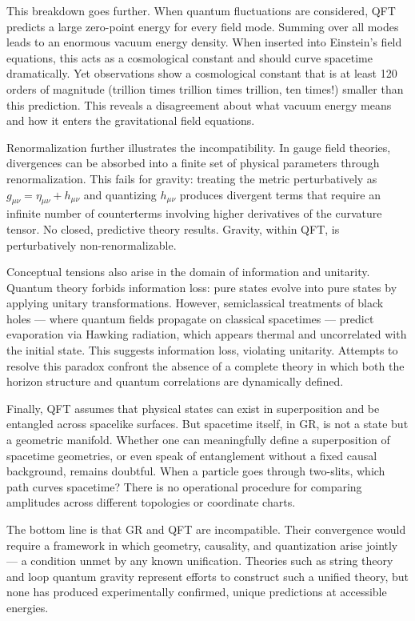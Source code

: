 This breakdown goes further. When quantum fluctuations are considered, QFT predicts a large zero-point energy for every field mode. Summing over all modes leads to an enormous vacuum energy density. When inserted into Einstein’s field equations, this acts as a cosmological constant and should curve spacetime dramatically. Yet observations show a cosmological constant that is at least 120 orders of magnitude (trillion times trillion times trillion, ten times!) smaller than this prediction. This reveals a disagreement about what vacuum energy means and how it enters the gravitational field equations.

Renormalization further illustrates the incompatibility. In gauge field theories, divergences can be absorbed into a finite set of physical parameters through renormalization. This fails for gravity: treating the metric perturbatively as $g_{\mu\nu} = \eta_{\mu\nu} + h_{\mu\nu}$ and quantizing $h_{\mu\nu}$ produces divergent terms that require an infinite number of counterterms involving higher derivatives of the curvature tensor. No closed, predictive theory results. Gravity, within QFT, is perturbatively non-renormalizable.

Conceptual tensions also arise in the domain of information and unitarity. Quantum theory forbids information loss: pure states evolve into pure states by applying unitary transformations. However, semiclassical treatments of black holes — where quantum fields propagate on classical spacetimes — predict evaporation via Hawking radiation, which appears thermal and uncorrelated with the initial state. This suggests information loss, violating unitarity. Attempts to resolve this paradox confront the absence of a complete theory in which both the horizon structure and quantum correlations are dynamically defined.

Finally, QFT assumes that physical states can exist in superposition and be entangled across spacelike surfaces. But spacetime itself, in GR, is not a state but a geometric manifold. Whether one can meaningfully define a superposition of spacetime geometries, or even speak of entanglement without a fixed causal background, remains doubtful. When a particle goes through two-slits, which path curves spacetime? There is no operational procedure for comparing amplitudes across different topologies or coordinate charts.

The bottom line is that GR and QFT are incompatible. Their convergence would require a framework in which geometry, causality, and quantization arise jointly — a condition unmet by any known unification. Theories such as string theory and loop quantum gravity represent efforts to construct such a unified theory, but none has produced experimentally confirmed, unique predictions at accessible energies.

